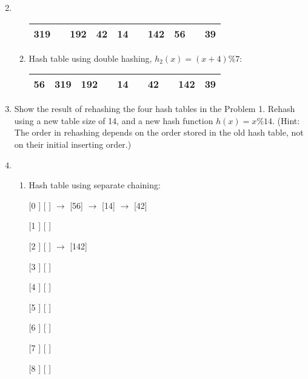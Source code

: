 \documentclass[12pt,a4paper]{article}
\makeatletter
\newtheorem*{solution}{Solution}
\theoremstyle{definition}
\renewenvironment{solution}[1][Solution] {\par\pushQED{\qed}\normalfont\topsep6\p@\@plus6\p@\relax\trivlist\item[\hskip\labelsep\bfseries#1\@addpunct{.}]\ignorespaces}{\popQED\endtrivlist\@endpefalse} \makeatother
\makeatother
\begin{document}
\begin{enumerate}
\begin{solution}
\begin{enumerate}
		\begin{table}[ht]
			\centering
			\begin{tabular}{|c|c|c|c|c|c|c|c|c|c|}
				\hline
				
				319 &  & 192 & 42 & 14 &  & 142 & 56 &  & 39 \\ \hline
				
			\end{tabular}
		\end{table}
		
		\item Hash table using double hashing, $h_2 (x) = (x+4)\%7$:
		
				\begin{table}[ht]
			\centering
			\begin{tabular}{|c|c|c|c|c|c|c|c|c|c|}
				\hline
				
		56 &319  & 192 &  & 14 &  & 42 &  & 142  & 39 \\ \hline 
				
			\end{tabular}
		\end{table}
	\end{enumerate}
\end{solution}



\item	 Show the result of rehashing the four hash tables in the Problem 1. Rehash
using a new table size of 14, and a new hash function $h(x) = x\%14$. {\color{blue}(Hint: The order
in rehashing depends on the order stored in the old hash table, not on their initial
inserting order.)}

\begin{solution}
	~\\
	\begin{enumerate}
		\item Hash table using separate chaining:
		
		[0 ] [  ] $\rightarrow$ [56] $\rightarrow$ [14] $\rightarrow$ [42]
		
		[1 ]  [  ]
		
		[2 ] [  ] $\rightarrow$ [142] 
		
		[3 ] [  ]
		
		[4 ] [  ] 
		
		[5 ] [  ]
		
		[6 ] [  ] 
		
		[7 ] [  ]
		
		[8 ] [  ]
		

\end{enumerate}
\end{solution}
\end{enumerate}
\end{document}
